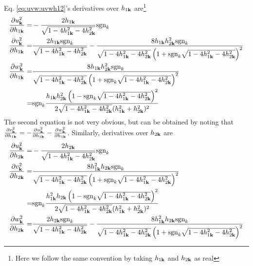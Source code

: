 Eq. \ref{eq:uvw:uvwh12}'s  derivatives over $h_{1\vk}$ are\footnote{Here we follow the same convention by taking $h_{1\vk}$ and $h_{2\vk}$ as real}
\begin{equation}
\begin{split}
\pdiff{u_{\vk}^2}{h_{1\vk}}=&-\frac{2 h_{1\vk}}{\sqrt{1-4 h_{1\vk}^2-4 h_{2\vk}^2}}\sgn_{k}\\
\pdiff{v_{\vk}^2}{h_{1\vk}}=&\frac{2 h_{1\vk}\sgn_k}{\sqrt{1-4 h_{1\vk}^2-4 h_{2\vk}^2}}-\frac{8 h_{1\vk} h_{2\vk}^2\sgn_{k}}{\sqrt{1-4 h_{1\vk}^2-4 h_{2\vk}^2} \left(1+\sgn_{k}\sqrt{1-4 h_{1\vk}^2-4 h_{2\vk}^2}\right)^2}\\
\pdiff{w_{\vk}^2}{h_{1\vk}}=&\frac{8 h_{1\vk} h_{2\vk}^2\sgn_{k}}{\sqrt{1-4 h_{1\vk}^2-4 h_{2\vk}^2} \left(1+\sgn_{k}\sqrt{1-4 h_{1\vk}^2-4 h_{2\vk}^2}\right)^2}\\
=&\sgn_{k}\frac{h_{1\vk} h_{2\vk}^2 \left(1-\sgn_{k}\sqrt{1-4 h_{1\vk}^2-4 h_{2\vk}^2}\right)^2}{2\sqrt{1-4 h_{1\vk}^2-4 h_{2\vk}^2} (h_{1\vk}^2 + h_{2\vk}^2)^2}
\end{split}
\end{equation}
The second equation is not very obvious, but can be obtained by noting that $\pdiff{v_{\vk}^2}{h_{1\vk}}=-\pdiff{u_{\vk}^2}{h_{1\vk}}-\pdiff{w_{\vk}^2}{h_{1\vk}}$.   Similarly, derivatives over $h_{2\vk}$ are
\begin{equation}
\begin{split}
\pdiff{u_{\vk}^2}{h_{2\vk}}=&-\frac{2 h_{2\vk}}{\sqrt{1-4 h_{1\vk}^2-4 h_{2\vk}^2}}\sgn_{k}\\
\pdiff{v_{\vk}^2}{h_{2\vk}}=&\frac{8 h_{1\vk} ^{2}h_{2\vk}\sgn_{k}}{\sqrt{1-4 h_{1\vk}^2-4 h_{2\vk}^2} \left(1+\sgn_{k}\sqrt{1-4 h_{1\vk}^2-4 h_{2\vk}^2}\right)^2}\\
=&\sgn_{k}\frac{h_{1\vk}^{2}h_{2\vk} \left(1-\sgn_{k}\sqrt{1-4 h_{1\vk}^2-4 h_{2\vk}^2}\right)^2}{2\sqrt{1-4 h_{1\vk}^2-4 h_{2\vk}^2} (h_{1\vk}^2 + h_{2\vk}^2)^2}\\
\pdiff{w_{\vk}^2}{h_{2\vk}}=&\frac{2 h_{2\vk}\sgn_k}{\sqrt{1-4 h_{1\vk}^2-4 h_{2\vk}^2}}-\frac{8 h_{1\vk} ^{2}h_{2\vk}\sgn_{k}}{\sqrt{1-4 h_{1\vk}^2-4 h_{2\vk}^2} \left(1+\sgn_{k}\sqrt{1-4 h_{1\vk}^2-4 h_{2\vk}^2}\right)^2}
\end{split}
\end{equation}

